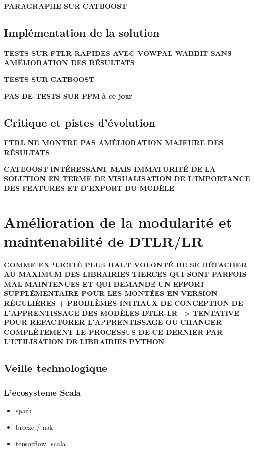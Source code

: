     \textbf{PARAGRAPHE SUR CATBOOST}
    
    
    \subsection{Implémentation de la solution}
        \textbf{TESTS SUR FTLR RAPIDES AVEC VOWPAL WABBIT SANS AMËLIORATION DES RÉSULTATS} \par
        \textbf{TESTS SUR CATBOOST} \par 
        \textbf{PAS DE TESTS SUR FFM à ce jour}
    \subsection{Critique et pistes d'évolution}
        \textbf{FTRL NE MONTRE PAS AMÉLIORATION MAJEURE DES RÉSULTATS} \par
        \textbf{CATBOOST INTÉRESSANT MAIS IMMATURITÉ DE LA SOLUTION EN TERME DE VISUALISATION DE L'IMPORTANCE DES FEATURES ET D'EXPORT DU MODÈLE}
        
    
\section{Amélioration de la modularité et maintenabilité de DTLR/LR}
    \textbf{COMME EXPLICITÉ PLUS HAUT VOLONTÉ DE SE DÉTACHER AU MAXIMUM DES LIBRAIRIES TIERCES QUI SONT PARFOIS MAL MAINTENUES ET QUI DEMANDE UN EFFORT SUPPLÉMENTAIRE POUR LES MONTÉES EN VERSION RÉGULIÈRES + PROBLÈMES INITIAUX DE CONCEPTION DE L'APPRENTISSAGE DES MODÈLES DTLR-LR --> TENTATIVE POUR REFACTORER L'APPRENTISSAGE OU CHANGER COMPLÈTEMENT LE PROCESSUS DE CE DERNIER PAR L'UTILISATION DE LIBRAIRIES PYTHON}
    \subsection{Veille technologique}
        \subsubsection{L'ecosysteme Scala}
            \begin{itemize}
                \item spark
                \item breeze / nak
                \item tensorflow\_scala
            \end{itemize}
